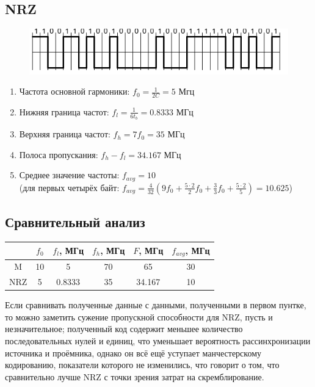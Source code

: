 \documentclass[12pt, a4paper] {ncc}
\begin{document}
	\subsection*{NRZ}
		\begin{figure}[h!]
			\includegraphics{../img/NRZS57.png}
		\end{figure}
		\begin{enumerate}
			\item Частота основной гармоники: $f_0 = \frac {1} {2C} = 5$ Мгц
			 \item Нижняя граница частот: $f_l = \frac {1} {6t_b} = 0.8333$ МГц
			\item Верхняя граница частот: $f_h = 7f_0 = 35$ МГц 
 			\item Полоса пропускания: $f_h - f_l = 34.167$ МГц 
			\item Среднее значение частоты: $f_{avg} = 10$ \\
				  (для первых четырёх байт: $f_{avg} = \frac {4} {32} (9f_0 + \frac {5 \cdot 2} {2} f_0 + \frac {3} {3} f_0 + \frac {5 \cdot 2} {5}) = 10.625$)
		\end{enumerate}


	\subsection*{Сравнительный анализ}
    \begin{table}[!h]
        \begin{tabular}{|c|c|c|c|c|c|}
            \hline
                & $f_0$ & $f_l$, МГц & $f_h$, МГц & $F$, МГц & $f_{avg}$, МГц \\ \hline
            M   & 10    & 5          & 70         & 65       &  30			  \\ \hline
            NRZ & 5     & 0.8333     & 35         & 34.167   &  10        \\ \hline
        \end{tabular}
    \end{table}
	
	Если сравнивать полученные данные с данными, полученными в первом пунтке, то можно заметить
	сужение пропускной способности для NRZ, пусть и незначительное; полученный код
	содержит меньшее количество последовательных нулей и единиц, что уменьшает вероятность
	рассинхронизации источника и проёмника, однако он всё ещё уступает манчестерскому кодированию,
    показатели которого не изменились, что говорит о том, что сравнительно лучше NRZ
    с точки зрения затрат на скремблирование. 
\end{document}
